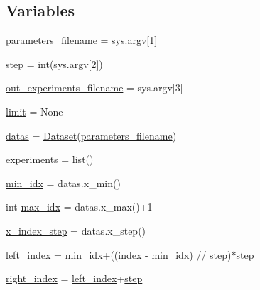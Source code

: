 \subsection*{Variables}
\begin{DoxyCompactItemize}
\item 
\hyperlink{namespacelist__skip__n__experiments_ae7d7e751880714692ef0ba6f35163da3}{parameters\+\_\+filename} = sys.\+argv\mbox{[}1\mbox{]}
\item 
\hyperlink{namespacelist__skip__n__experiments_a2b0ba5c1eae77169da727be27ba77df8}{step} = int(sys.\+argv\mbox{[}2\mbox{]})
\item 
\hyperlink{namespacelist__skip__n__experiments_aa6076cc866fef80f0751f37c54685ea9}{out\+\_\+experiments\+\_\+filename} = sys.\+argv\mbox{[}3\mbox{]}
\item 
\hyperlink{namespacelist__skip__n__experiments_af39c9c5347aadcd2c36c72d00e858b4b}{limit} = None
\item 
\hyperlink{namespacelist__skip__n__experiments_a285dbe25dabb27c98c0c63029f52426a}{datas} = \hyperlink{classpylib_1_1dataset_1_1Dataset}{Dataset}(\hyperlink{namespacelist__skip__n__experiments_ae7d7e751880714692ef0ba6f35163da3}{parameters\+\_\+filename})
\item 
\hyperlink{namespacelist__skip__n__experiments_a940229173ead33055747748a2b74ee45}{experiments} = list()
\item 
\hyperlink{namespacelist__skip__n__experiments_a1469c5c024e30fd45f71256f1bf9de65}{min\+\_\+idx} = datas.\+x\+\_\+min()
\item 
int \hyperlink{namespacelist__skip__n__experiments_a9be0d16f00e062e89bbf05a8a5f2ded8}{max\+\_\+idx} = datas.\+x\+\_\+max()+1
\item 
\hyperlink{namespacelist__skip__n__experiments_a05955a8175ac6d7e387276a35b520b56}{x\+\_\+index\+\_\+step} = datas.\+x\+\_\+step()
\item 
\hyperlink{namespacelist__skip__n__experiments_aab171a1ef6dd6c7d8f5c64e74876f9ff}{left\+\_\+index} = \hyperlink{namespacelist__skip__n__experiments_a1469c5c024e30fd45f71256f1bf9de65}{min\+\_\+idx}+((index -\/ \hyperlink{namespacelist__skip__n__experiments_a1469c5c024e30fd45f71256f1bf9de65}{min\+\_\+idx}) // \hyperlink{namespacelist__skip__n__experiments_a2b0ba5c1eae77169da727be27ba77df8}{step})$\ast$\hyperlink{namespacelist__skip__n__experiments_a2b0ba5c1eae77169da727be27ba77df8}{step}
\item 
\hyperlink{namespacelist__skip__n__experiments_ac819b38ecab50279acd6b6506889bf59}{right\+\_\+index} = \hyperlink{namespacelist__skip__n__experiments_aab171a1ef6dd6c7d8f5c64e74876f9ff}{left\+\_\+index}+\hyperlink{namespacelist__skip__n__experiments_a2b0ba5c1eae77169da727be27ba77df8}{step}
\end{DoxyCompactItemize}


